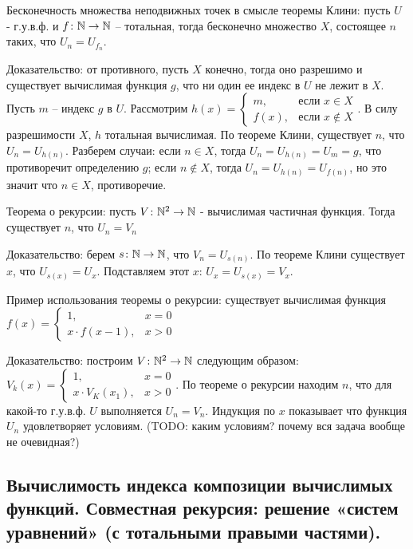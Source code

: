 \documentclass[a4paper, 10pt]{article}
\begin{document}
Бесконечность множества неподвижных точек в смысле теоремы Клини: пусть $U$ - г.у.в.ф. и $f\colon\mathbb{N}\to\mathbb{N}$ -- тотальная, тогда бесконечно множество $X$, состоящее $n$ таких, что $U_n=U_{f_n}$.

Доказательство: от противного, пусть $X$ конечно, тогда оно разрешимо и существует вычислимая функция $g$, что ни один ее индекс в $U$ не лежит в $X$. Пусть $m$ -- индекс $g$ в $U$. Рассмотрим $h(x)=\begin{cases}
    m,&\text{если }x\in X \\ f(x),&\text{если }x\not\in X
\end{cases}$. В силу разрешимости $X$, $h$ тотальная вычислимая. По теореме Клини, существует $n$, что $U_n=U_{h(n)}$. Разберем случаи: если $n\in X$, тогда $U_n=U_{h(n)}=U_m=g$, что противоречит определению $g$; если $n\not\in X$, тогда $U_n=U_{h(n)}=U_{f(n)}$, но это значит что $n\in X$, противоречие.

\hfill

Теорема о рекурсии: пусть $V\colon\mathbb{N}^2\to\mathbb{N}$ - вычислимая частичная функция. Тогда существует $n$, что $U_n=V_n$

Доказательство: берем $s\colon\mathbb{N}\to\mathbb{N}$, что $V_n=U_{s(n)}$. По теореме Клини существует $x$, что $U_{s(x)}=U_x$. Подставляем этот $x$: $U_x=U_{s(x)}=V_x$.

\hfill

Пример использования теоремы о рекурсии: существует вычислимая функция $f(x)=\begin{cases}
    1,&x=0 \\ x\cdot f(x-1),&x>0
\end{cases}$

Доказательство: построим $V\colon\mathbb{N}^2\to\mathbb{N}$ следующим образом: $V_k(x)=\begin{cases}
    1,&x=0 \\ x\cdot V_K(x_1),&x>0
\end{cases}$. По теореме о рекурсии находим $n$, что для какой-то г.у.в.ф. $U$ выполняется $U_n=V_n$. Индукция по $x$ показывает что функция $U_n$ удовлетворяет условиям. (TODO: каким условиям? почему вся задача вообще не очевидная?)

\subsection{Вычислимость индекса композиции вычислимых функций. Совместная рекурсия: решение «систем уравнений» (с тотальными правыми частями).}
\end{document}
